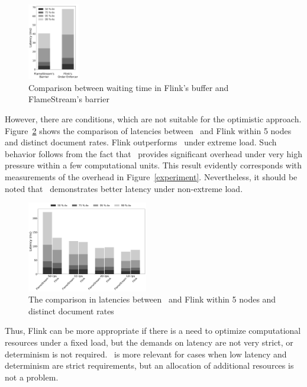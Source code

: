 \begin{figure}[htbp]
  \centering
  \includegraphics[width=0.20\textwidth]{pics/buffer-vs-barrier}
  \caption{Comparison between waiting time in Flink's buffer and FlameStream's barrier}
  \label {buffer-vs-barrier}
\end{figure}

However, there are conditions, which are not suitable for the optimistic approach. Figure~\ref{fs-index-quantiles-5} shows the comparison of latencies between \FlameStream\ and Flink within 5 nodes and distinct document rates. Flink outperforms \FlameStream\ under extreme load. Such behavior follows from the fact that \FlameStream\ provides significant overhead under very high pressure within a few computational units. This result evidently corresponds with measurements of the overhead in Figure~\ref{experiment}. Nevertheless, it should be noted that \FlameStream\ demonstrates better latency under non-extreme load.

\begin{figure}[htbp]
  \centering
  \includegraphics[width=0.47\textwidth]{pics/comp-index-quantiles_5}
  \caption{The comparison in latencies between \FlameStream\ and Flink within 5 nodes and distinct document rates}
  \label {fs-index-quantiles-5}
\end{figure}

Thus, Flink can be more appropriate if there is a need to optimize computational resources under a fixed load, but the demands on latency are not very strict, or determinism is not required. \FlameStream\ is more relevant for cases when low latency and determinism are strict requirements, but an allocation of additional resources is not a problem.  

